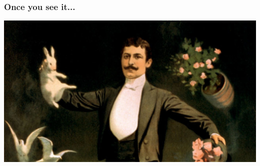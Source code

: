 \begin{frame}
\frametitle{Once you see it...}

\begin{center}
  \includegraphics[width=\textwidth]{magician.jpg}
\end{center}

\end{frame}
